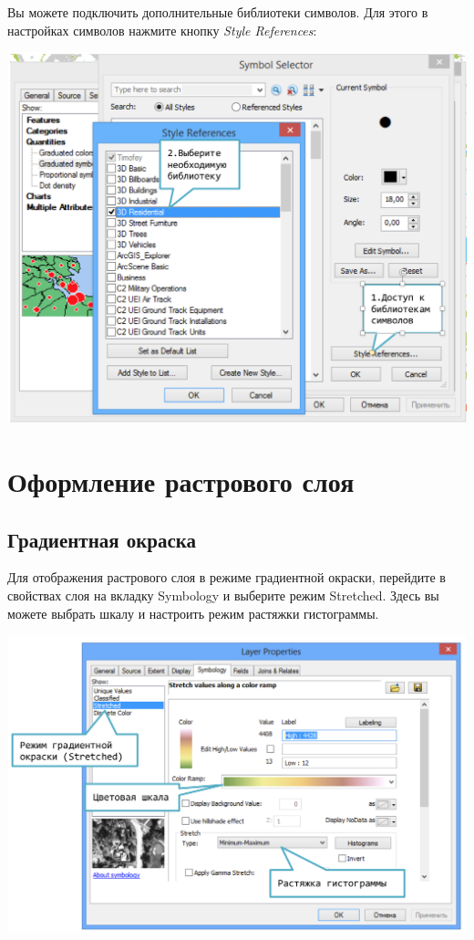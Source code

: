 \documentclass[]{book}
\theoremstyle{definition}
\theoremstyle{definition}
\theoremstyle{definition}
\theoremstyle{remark}
\begin{document}
Вы можете подключить дополнительные библиотеки символов. Для этого в
настройках символов нажмите кнопку \emph{Style References}:

\includegraphics{images/Appendix/image36.png}

\hypertarget{manual-raster}{%
\chapter{Оформление растрового слоя}\label{manual-raster}}

\hypertarget{-}{%
\section{Градиентная окраска}\label{-}}

Для отображения растрового слоя в режиме градиентной окраски, перейдите
в свойствах слоя на вкладку Symbology и выберите режим Stretched. Здесь
вы можете выбрать шкалу и настроить режим растяжки гистограммы.

\includegraphics{images/Appendix/image37.png}
\end{document}
